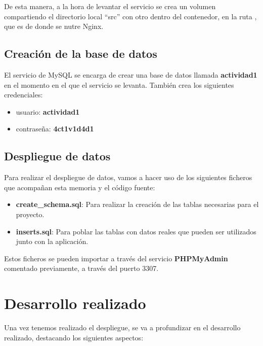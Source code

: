\documentclass{\ClassPath/viu-tfm-template}
\begin{document}
De esta manera, a la hora de levantar el servicio se crea un volumen compartiendo el directorio local “src” con otro dentro del contenedor, en la ruta , que es de donde se nutre Nginx.


\section{Creación de la base de datos}

El servicio de MySQL se encarga de crear una base de datos llamada \textbf{actividad1} en el momento en el que el servicio se levanta. También crea los siguientes credenciales:

\vspace{-1em}
\begin{itemize}
    \item usuario:  \textbf{actividad1}
    \item contraseña:  \textbf{4ct1v1d4d1}
\end{itemize}
\vspace{-1em}

\section{Despliegue de datos}
Para realizar el despliegue de datos, vamos a hacer uso de los siguientes ficheros que acompañan esta memoria y el código fuente:

\vspace{-1em}
\begin{itemize}
    \item \textbf{create\_schema.sql}: Para realizar la creación de las tablas necesarias para el proyecto.
    \item \textbf{inserts.sql}: Para poblar las tablas con datos reales que pueden ser utilizados junto con la aplicación.
\end{itemize}
\vspace{-1em}

Estos ficheros se pueden importar a través del servicio \textbf{PHPMyAdmin} comentado previamente, a través del puerto 3307.


\chapter{Desarrollo realizado}

Una vez tenemos realizado el despliegue, se va a profundizar en el desarrollo realizado, destacando los siguientes aspectos:
\end{document}
